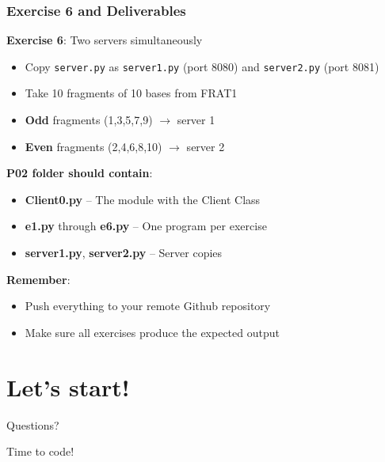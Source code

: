 \documentclass[xcolor=table]{beamer}
\begin{document}
\begin{frame}
\frametitle{Exercise 6 and Deliverables}

\textbf{Exercise 6}: Two servers simultaneously
\begin{itemize}
\item Copy \texttt{server.py} as \texttt{server1.py} (port 8080) and \texttt{server2.py} (port 8081)
\item Take 10 fragments of 10 bases from FRAT1
\item \textbf{Odd} fragments (1,3,5,7,9) $\rightarrow$ server 1
\item \textbf{Even} fragments (2,4,6,8,10) $\rightarrow$ server 2
\end{itemize}

\vspace{0.4cm}

\textbf{P02 folder should contain}:

\begin{itemize}
\item \textbf{Client0.py} -- The module with the Client Class
\item \textbf{e1.py} through \textbf{e6.py} -- One program per exercise
\item \textbf{server1.py}, \textbf{server2.py} -- Server copies
\end{itemize}

\vspace{0.3cm}

\textbf{Remember}:
\begin{itemize}
\item Push everything to your remote Github repository
\item Make sure all exercises produce the expected output
\end{itemize}

\end{frame}


\section{Let's start!}

\begin{frame}
\begin{center}
\Huge{Questions?}

\vspace{1cm}

\Large{Time to code!}
\end{center}
\end{frame}
\end{document}
